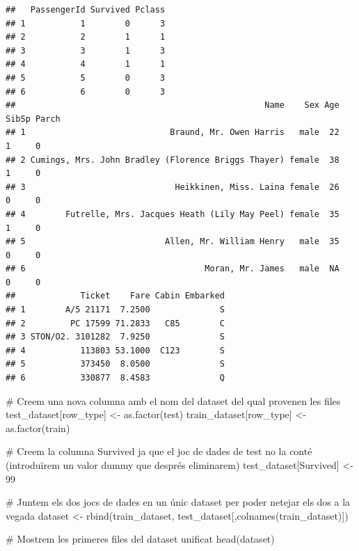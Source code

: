 \documentclass[
]{article}
\newenvironment{Shaded}{\begin{snugshade}}{\end{snugshade}}
\newcommand{\CommentTok}[1]{\textcolor[rgb]{0.50,0.62,0.50}{#1}}
\newcommand{\DecValTok}[1]{\textcolor[rgb]{0.86,0.86,0.80}{#1}}
\newcommand{\FunctionTok}[1]{\textcolor[rgb]{0.94,0.94,0.56}{#1}}
\newcommand{\NormalTok}[1]{\textcolor[rgb]{0.80,0.80,0.80}{#1}}
\newcommand{\OtherTok}[1]{\textcolor[rgb]{0.94,0.94,0.56}{#1}}
\newcommand{\StringTok}[1]{\textcolor[rgb]{0.80,0.58,0.58}{#1}}
\begin{document}
\begin{verbatim}
##   PassengerId Survived Pclass
## 1           1        0      3
## 2           2        1      1
## 3           3        1      3
## 4           4        1      1
## 5           5        0      3
## 6           6        0      3
##                                                  Name    Sex Age SibSp Parch
## 1                             Braund, Mr. Owen Harris   male  22     1     0
## 2 Cumings, Mrs. John Bradley (Florence Briggs Thayer) female  38     1     0
## 3                              Heikkinen, Miss. Laina female  26     0     0
## 4        Futrelle, Mrs. Jacques Heath (Lily May Peel) female  35     1     0
## 5                            Allen, Mr. William Henry   male  35     0     0
## 6                                    Moran, Mr. James   male  NA     0     0
##             Ticket    Fare Cabin Embarked
## 1        A/5 21171  7.2500              S
## 2         PC 17599 71.2833   C85        C
## 3 STON/O2. 3101282  7.9250              S
## 4           113803 53.1000  C123        S
## 5           373450  8.0500              S
## 6           330877  8.4583              Q
\end{verbatim}

\begin{Shaded}
\begin{Highlighting}[]
\CommentTok{\# Creem una nova columna amb el nom del dataset del qual provenen les files}
\NormalTok{test\_dataset[}\StringTok{\textquotesingle{}row\_type\textquotesingle{}}\NormalTok{] }\OtherTok{\textless{}{-}} \FunctionTok{as.factor}\NormalTok{(}\StringTok{\textquotesingle{}test\textquotesingle{}}\NormalTok{)}
\NormalTok{train\_dataset[}\StringTok{\textquotesingle{}row\_type\textquotesingle{}}\NormalTok{] }\OtherTok{\textless{}{-}} \FunctionTok{as.factor}\NormalTok{(}\StringTok{\textquotesingle{}train\textquotesingle{}}\NormalTok{)}

\CommentTok{\# Creem la columna \textquotesingle{}Survived\textquotesingle{} ja que el joc de dades de test no la conté (introduïrem un valor dummy que després eliminarem)}
\NormalTok{test\_dataset[}\StringTok{\textquotesingle{}Survived\textquotesingle{}}\NormalTok{] }\OtherTok{\textless{}{-}} \DecValTok{99}

\CommentTok{\# Juntem els dos jocs de dades en un únic dataset per poder netejar els dos a la vegada}
\NormalTok{dataset }\OtherTok{\textless{}{-}} \FunctionTok{rbind}\NormalTok{(train\_dataset, test\_dataset[,}\FunctionTok{colnames}\NormalTok{(train\_dataset)])}

\CommentTok{\# Mostrem les primeres files del dataset unificat}
\FunctionTok{head}\NormalTok{(dataset)}
\end{Highlighting}
\end{Shaded}
\end{document}
